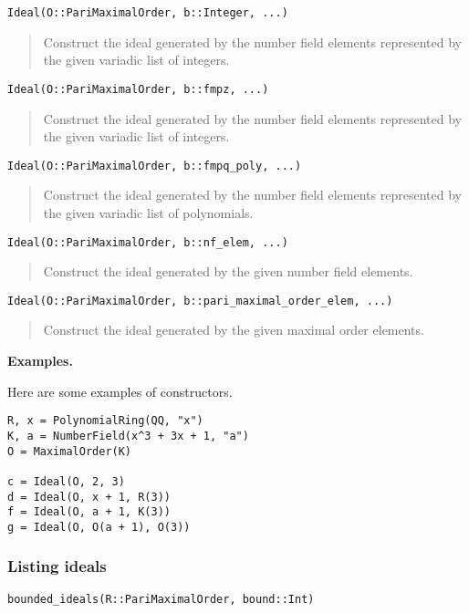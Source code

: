 \documentclass[a4paper,10pt]{article}
\newcommand{\desc}[1]{\vspace{-3mm}\begin{quote}#1\end{quote}}
\begin{document}
{{\begin{lstlisting}
Ideal(O::PariMaximalOrder, b::Integer, ...)
\end{lstlisting}

\desc{Construct the ideal generated by the number field elements represented
by the given variadic list of integers.}

\begin{lstlisting}
Ideal(O::PariMaximalOrder, b::fmpz, ...)
\end{lstlisting}

\desc{Construct the ideal generated by the number field elements represented
by the given variadic list of integers.}

\begin{lstlisting}
Ideal(O::PariMaximalOrder, b::fmpq_poly, ...)
\end{lstlisting}

\desc{Construct the ideal generated by the number field elements represented
by the given variadic list of polynomials.}

\begin{lstlisting}
Ideal(O::PariMaximalOrder, b::nf_elem, ...)
\end{lstlisting}

\desc{Construct the ideal generated by the given number field elements.}

\begin{lstlisting}
Ideal(O::PariMaximalOrder, b::pari_maximal_order_elem, ...)
\end{lstlisting}

\desc{Construct the ideal generated by the given maximal order elements.}

\textbf{Examples.}

Here are some examples of constructors.

\begin{lstlisting}
R, x = PolynomialRing(QQ, "x")
K, a = NumberField(x^3 + 3x + 1, "a")
O = MaximalOrder(K)

c = Ideal(O, 2, 3)
d = Ideal(O, x + 1, R(3))
f = Ideal(O, a + 1, K(3))
g = Ideal(O, O(a + 1), O(3))
\end{lstlisting}

\subsubsection{Listing ideals}

\begin{lstlisting}
bounded_ideals(R::PariMaximalOrder, bound::Int)
\end{lstlisting}

}}
\end{document}
